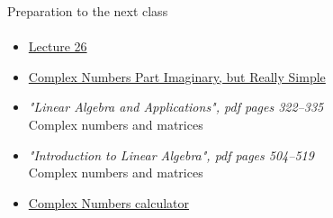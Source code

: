 \documentclass[aspectratio=169]{beamer}
\newcommand{\fbckg}[1]{\usebackgroundtemplate{\texttt{[image: \#1]}}}%
\begin{document}
\begin{frame}[t]{Preparation to the next class}
    \framesubtitle{}
    \Large
    \begin{itemize}
        \item \href{https://www.youtube.com/watch?v=M0Sa8fLOajA&list=PL49CF3715CB9EF31D&index=27}{Lecture 26}
        \item \href{https://youtu.be/Jkv-55ndVYY}{Complex Numbers Part Imaginary, but Really Simple}
        \item \textit{"Linear Algebra and Applications", pdf pages 322--335 }\\ Complex numbers and matrices
        \item \textit{"Introduction to Linear Algebra", pdf pages 504--519 }\\ Complex numbers and matrices
        \item \href{https://programforyou.ru/calculators/complex-calculator}{Complex Numbers calculator}
    \end{itemize}
\end{frame}

\fbckg{fibeamer/figs/last_page.png}
\frame[plain]{}
\end{document}
